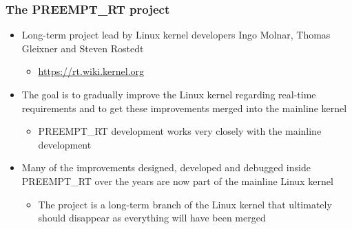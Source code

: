 \begin{frame}
  \frametitle{The PREEMPT\_RT project}
  \begin{itemize}
  \item Long-term project lead by Linux kernel developers Ingo Molnar,
    Thomas Gleixner and Steven Rostedt
    \begin{itemize}
    \item \url{https://rt.wiki.kernel.org}
    \end{itemize}
  \item The goal is to gradually improve the Linux kernel regarding
    real-time requirements and to get these improvements merged into
    the mainline kernel
    \begin{itemize}
    \item PREEMPT\_RT development works very closely with the mainline
      development
    \end{itemize}
  \item Many of the improvements designed, developed and debugged
    inside PREEMPT\_RT over the years are now part of the mainline
    Linux kernel
    \begin{itemize}
    \item The project is a long-term branch of the Linux kernel that
      ultimately should disappear as everything will have been merged
    \end{itemize}
  \end{itemize}
\end{frame}

